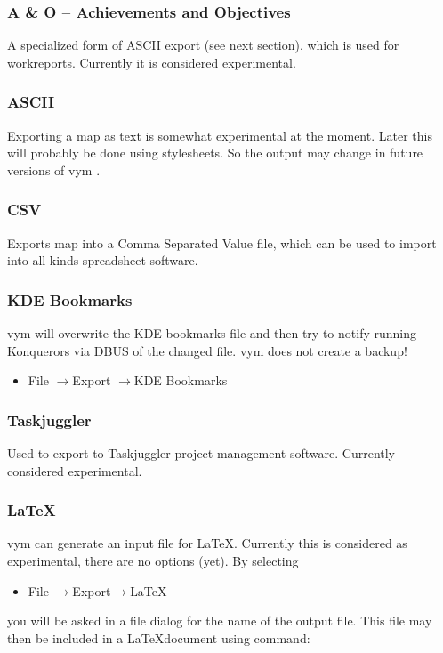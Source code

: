 \documentclass[12pt,a4paper]{article}
\newcommand{\vym}{{\sc vym }}
\newcommand{\ra}{$\longrightarrow$}
\begin{document}
\subsubsection*{A \& O -- Achievements and Objectives}
A specialized form of ASCII export (see next section), which is used for
workreports. Currently it is considered experimental.

\subsubsection*{ASCII}
Exporting a map as text is somewhat experimental at the moment. Later
this will probably be done using stylesheets. So the output may change
in future versions of \vym.

\subsubsection*{CSV}
Exports map into a Comma Separated Value file, which can be used to
import into all kinds spreadsheet software.

\subsubsection*{KDE Bookmarks}
\vym will overwrite the KDE bookmarks file and then try to notify
running Konquerors via DBUS of the changed file. \vym does not create a
backup!
\begin{itemize}
    \item File \ra Export \ra KDE Bookmarks
\end{itemize}

\subsubsection*{Taskjuggler}
Used to export to Taskjuggler project management software. Currently
considered experimental.

\subsubsection*{\LaTeX}
\vym can generate an input file for \LaTeX. Currently this is considered
as experimental, there are no options (yet). 
By selecting
\begin{itemize}
    \item File  \ra Export\ra \LaTeX 
\end{itemize}
you will be asked in a file dialog for the name of the output file. This
file may then be included in a \LaTeX document using command: 
\begin{verbatim}
    
\end{verbatim}
\end{document}

